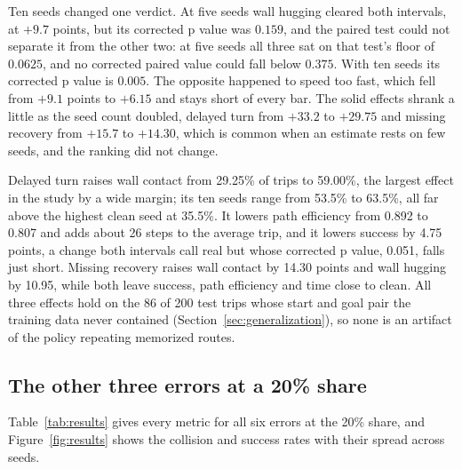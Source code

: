 \documentclass[conference]{IEEEtran}
\begin{document}
Ten seeds changed one verdict. At five seeds wall hugging cleared both intervals, at $+9.7$ points, but its
corrected p value was $0.159$, and the paired test could not separate it from the other two: at five seeds all
three sat on that test's floor of $0.0625$, and no corrected paired value could fall below $0.375$. With ten seeds
its corrected p value is $0.005$. The opposite happened to speed too fast, which fell from $+9.1$ points to
$+6.15$ and stays short of every bar. The solid effects shrank a little as the seed count doubled, delayed turn
from $+33.2$ to $+29.75$ and missing recovery from $+15.7$ to $+14.30$, which is common when an estimate rests on
few seeds, and the ranking did not change.

Delayed turn raises wall contact from 29.25\% of trips to 59.00\%, the largest effect in the study by a wide
margin; its ten seeds range from 53.5\% to 63.5\%, all far above the highest clean seed at 35.5\%. It lowers path
efficiency from 0.892 to 0.807 and adds about 26 steps to the average trip, and it lowers success by 4.75 points,
a change both intervals call real but whose corrected p value, 0.051, falls just short. Missing recovery raises
wall contact by 14.30 points and wall hugging by 10.95, while both leave success, path efficiency and time close
to clean. All three effects hold on the 86 of 200 test trips whose start and goal pair the training data never
contained (Section~\ref{sec:generalization}), so none is an artifact of the policy repeating memorized routes.

\subsection{The other three errors at a 20\% share}
Table~\ref{tab:results} gives every metric for all six errors at the 20\% share, and Figure~\ref{fig:results}
shows the collision and success rates with their spread across seeds.
\end{document}
